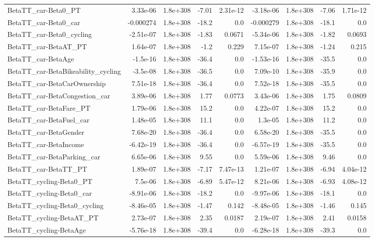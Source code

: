 \begin{tabular}{lrrrrrrrr}
BetaTT_car-Beta0_PT & 3.33e-06 & 1.8e+308 & -7.01 & 2.31e-12 & -3.18e-06 & 1.8e+308 & -7.06 & 1.71e-12 \\
BetaTT_car-Beta0_car & -0.000274 & 1.8e+308 & -18.2 & 0.0 & -0.000279 & 1.8e+308 & -18.1 & 0.0 \\
BetaTT_car-Beta0_cycling & -2.51e-07 & 1.8e+308 & -1.83 & 0.0671 & -5.34e-06 & 1.8e+308 & -1.82 & 0.0693 \\
BetaTT_car-BetaAT_PT & 1.64e-07 & 1.8e+308 & -1.2 & 0.229 & 7.15e-07 & 1.8e+308 & -1.24 & 0.215 \\
BetaTT_car-BetaAge & -1.5e-16 & 1.8e+308 & -36.4 & 0.0 & -1.53e-16 & 1.8e+308 & -35.5 & 0.0 \\
BetaTT_car-BetaBikeability_cycling & -3.5e-08 & 1.8e+308 & -36.5 & 0.0 & 7.09e-10 & 1.8e+308 & -35.9 & 0.0 \\
BetaTT_car-BetaCarOwnership & 7.51e-18 & 1.8e+308 & -36.4 & 0.0 & 7.52e-18 & 1.8e+308 & -35.5 & 0.0 \\
BetaTT_car-BetaCongestion_car & 3.89e-06 & 1.8e+308 & 1.77 & 0.0773 & 3.43e-06 & 1.8e+308 & 1.75 & 0.0809 \\
BetaTT_car-BetaFare_PT & 1.79e-06 & 1.8e+308 & 15.2 & 0.0 & 4.22e-07 & 1.8e+308 & 15.2 & 0.0 \\
BetaTT_car-BetaFuel_car & 1.48e-05 & 1.8e+308 & 11.1 & 0.0 & 1.3e-05 & 1.8e+308 & 11.2 & 0.0 \\
BetaTT_car-BetaGender & 7.68e-20 & 1.8e+308 & -36.4 & 0.0 & 6.58e-20 & 1.8e+308 & -35.5 & 0.0 \\
BetaTT_car-BetaIncome & -6.42e-19 & 1.8e+308 & -36.4 & 0.0 & -6.57e-19 & 1.8e+308 & -35.5 & 0.0 \\
BetaTT_car-BetaParking_car & 6.65e-06 & 1.8e+308 & 9.55 & 0.0 & 5.59e-06 & 1.8e+308 & 9.46 & 0.0 \\
BetaTT_car-BetaTT_PT & 1.89e-07 & 1.8e+308 & -7.17 & 7.47e-13 & 1.21e-07 & 1.8e+308 & -6.94 & 4.04e-12 \\
BetaTT_cycling-Beta0_PT & 7.5e-06 & 1.8e+308 & -6.89 & 5.47e-12 & 8.21e-06 & 1.8e+308 & -6.93 & 4.08e-12 \\
BetaTT_cycling-Beta0_car & -8.91e-06 & 1.8e+308 & -18.2 & 0.0 & -9.97e-06 & 1.8e+308 & -18.1 & 0.0 \\
BetaTT_cycling-Beta0_cycling & -8.46e-05 & 1.8e+308 & -1.47 & 0.142 & -8.48e-05 & 1.8e+308 & -1.46 & 0.145 \\
BetaTT_cycling-BetaAT_PT & 2.73e-07 & 1.8e+308 & 2.35 & 0.0187 & 2.19e-07 & 1.8e+308 & 2.41 & 0.0158 \\
BetaTT_cycling-BetaAge & -5.76e-18 & 1.8e+308 & -39.4 & 0.0 & -6.28e-18 & 1.8e+308 & -39.3 & 0.0 \\

\end{tabular}

